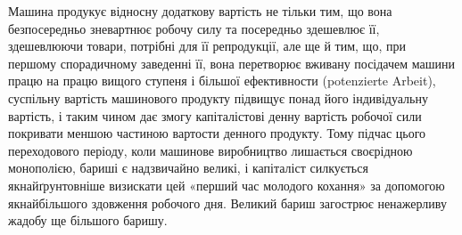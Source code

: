 
Машина продукує відносну додаткову вартість не тільки тим,
що вона безпосередньо зневартнює робочу силу та посередньо
здешевлює її, здешевлюючи товари, потрібні для її репродукції,
але ще й тим, що, при першому спорадичному заведенні її, вона
перетворює вживану посідачем машини працю на працю вищого
ступеня і більшої ефективности (potenzierte Arbeit), суспільну
вартість машинового продукту підвищує понад його індивідуальну
вартість, і таким чином дає змогу капіталістові денну вартість
робочої сили покривати меншою частиною вартости денного продукту.
Тому підчас цього переходового періоду, коли машинове
виробництво лишається своєрідною монополією, бариші є надзвичайно
великі, і капіталіст силкується якнайґрунтовніше визискати
цей «перший час молодого кохання» за допомогою якнайбільшого
здовження робочого дня. Великий бариш загострює ненажерливу
жадобу ще більшого баришу.

